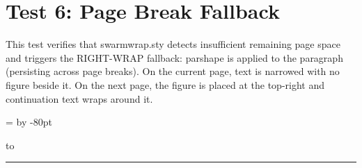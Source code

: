 \documentclass[a4paper,11pt]{article}
\begin{document}
\newpage
\section*{Test 6: Page Break Fallback}
This test verifies that swarmwrap.sty detects insufficient remaining
page space and triggers the RIGHT-WRAP fallback: parshape is applied
to the paragraph (persisting across page breaks). On the current page,
text is narrowed with no figure beside it. On the next page, the figure
is placed at the top-right and continuation text wraps around it.

\newdimen\swtestsixht
\swtestsixht=\textheight
\advance\swtestsixht by -80pt

\vbox to%

\begin{swarmwrap}%
  \begin{minipage}[t]{3cm}
    \centering
    \rule{\linewidth}{3.8cm}
    \label{fig:near-bottom}
  \end{minipage}%
\end{swarmwrap}%
\swarmwrapnext
\lipsum[1]
\end{document}
